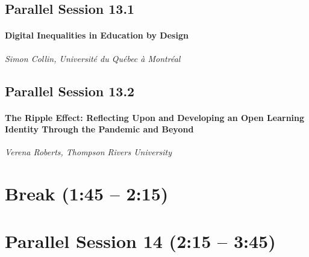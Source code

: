 \documentclass[
]{book}
\begin{document}
\hypertarget{parallel-session-13.1}{%
\subsection*{Parallel Session 13.1}\label{parallel-session-13.1}}

\begin{wp}
\hypertarget{digital-inequalities-in-education-by-design}{%
\paragraph{Digital Inequalities in Education by
Design}\label{digital-inequalities-in-education-by-design}}

\emph{Simon Collin, Université du Québec à Montréal}
\end{wp}

\hypertarget{parallel-session-13.2}{%
\subsection*{Parallel Session 13.2}\label{parallel-session-13.2}}

\begin{wp}
\hypertarget{the-ripple-effect-reflecting-upon-and-developing-an-open-learning-identity-through-the-pandemic-and-beyond}{%
\paragraph{The Ripple Effect: Reflecting Upon and Developing an Open
Learning Identity Through the Pandemic and
Beyond}\label{the-ripple-effect-reflecting-upon-and-developing-an-open-learning-identity-through-the-pandemic-and-beyond}}

\emph{Verena Roberts, Thompson Rivers University}
\end{wp}

\hypertarget{break-145-215-3}{%
\section*{Break (1:45 -- 2:15)}\label{break-145-215-3}}

\hypertarget{parallel-session-14-215-345}{%
\section*{Parallel Session 14 (2:15 -- 3:45)}\label{parallel-session-14-215-345}}
\end{document}

